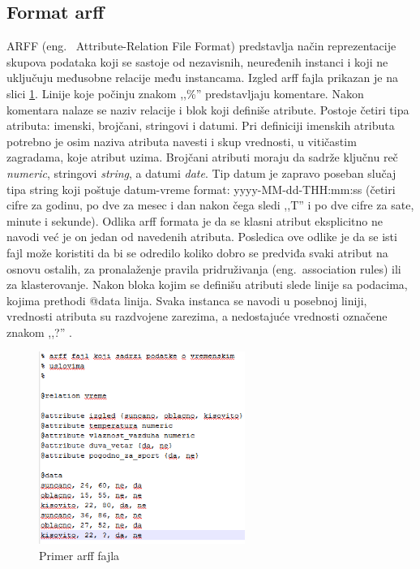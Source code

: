 \documentclass[12pt,oneside]{memoir}
\begin{document}
\subsection{Format arff}
ARFF (eng.~ Attribute-Relation File Format) predstavlja način reprezentacije skupova podataka koji se sastoje od nezavisnih, neuređenih instanci i koji ne uključuju međusobne relacije među instancama. Izgled arff fajla prikazan je na slici \ref{fig:arff}. Linije koje počinju znakom ,,\%'' predstavljaju komentare. Nakon komentara nalaze se naziv relacije i blok koji definiše atribute. Postoje četiri tipa atributa: imenski, brojčani, stringovi i datumi. Pri definiciji imenskih atributa potrebno je osim naziva atributa navesti i skup vrednosti, u vitičastim zagradama, koje atribut uzima. Brojčani atributi moraju da sadrže ključnu reč \textit{numeric}, stringovi \textit{string}, a datumi \textit{date}. Tip datum je zapravo poseban slučaj tipa string koji poštuje datum-vreme format: yyyy-MM-dd-THH:mm:ss (četiri cifre za godinu, po dve za mesec i dan nakon čega sledi ,,T'' i po dve cifre za sate, minute i sekunde). Odlika arff formata je da se klasni atribut eksplicitno ne navodi već je on jedan od navedenih atributa. Posledica ove odlike je da se isti fajl može koristiti da bi se odredilo koliko dobro se predviđa svaki atribut na osnovu ostalih, za pronalaženje pravila pridruživanja (eng.~association rules) ili za klasterovanje. Nakon bloka kojim se definišu atributi slede linije sa podacima, kojima prethodi @data linija. Svaka instanca se navodi u posebnoj liniji, vrednosti atributa su razdvojene zarezima, a nedostajuće vrednosti označene znakom ,,?'' \cite{weka}. 

\begin{figure}[!ht]
  \centering
  \includegraphics[width=0.60\textwidth]{arff.png}
  \caption{Primer arff fajla}
  \label{fig:arff}
\end{figure}
\end{document}
